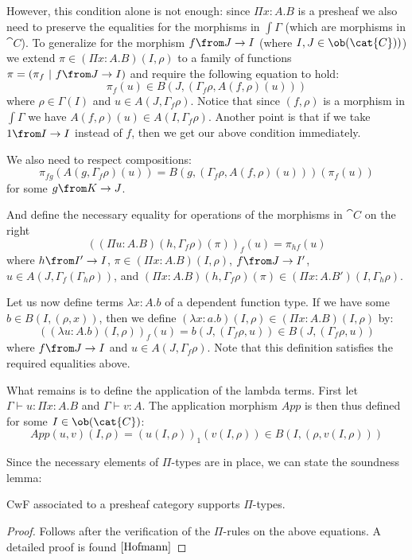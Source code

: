 However, this condition alone is not enough: since $\Pi x: A.B$ is a presheaf
we also need to preserve the equalities for the morphisms in $\int \Gamma$
(which are morphisms in $\cat{C}$). To generalize for the morphism $f \from J
\to I$ (where $I, J \in \ob(\cat{C}))$) we extend $\pi \in (\Pi x: A.B)(I,
\rho)$ to a family of functions $\pi = (\pi_f~|~f \from J \to I)$ and require
the following equation to hold:
\[
  \pi_f(u) \in B(J, (\Gamma_f \rho, A(f, \rho)(u)))
\]
where $\rho \in \Gamma(I)$ and $u \in A(J, \Gamma_f \rho)$. Notice that since
$(f, \rho)$ is a morphism in $\int \Gamma$ we have $A(f, \rho)(u) \in A(I,
\Gamma_f \rho)$. Another point is that if we take $1 \from I \to I$ instead of
$f$, then we get our above condition immediately.

We also need to respect compositions:
\[
  \pi_{fg}(A(g, \Gamma_f \rho)(u)) = B(g, (\Gamma_f \rho, A(f, \rho)(u)))(\pi_f(u))
\]
for some $g \from K \to J$.

And define the necessary equality for operations of the morphisms in $\cat{C}$
on the right
\[
  ((\Pi u: A.B)(h, \Gamma_f \rho)(\pi))_f(u) = \pi_{hf}(u)
\]
where $h \from I' \to I$, $\pi \in (\Pi x:A.B)(I, \rho)$, $f \from J \to I'$,
$u \in A(J, \Gamma_f(\Gamma_h \rho))$, and $(\Pi x: A.B)(h, \Gamma_f \rho)(\pi)
\in (\Pi x: A.B')(I, \Gamma_h \rho)$.

Let us now define terms $\lambda x: A. b$ of a dependent function type. If we
have some $b \in B(I, (\rho, x))$, then we define $(\lambda x: a.b)(I, \rho)
\in (\Pi x: A.B)(I, \rho)$ by:
\[
  ((\lambda u: A.b)(I, \rho))_f(u) = b(J, (\Gamma_f \rho, u)) \in B(J, (\Gamma_f \rho, u))
\]
where $f \from J \to I$ and $u \in A(J, \Gamma_f \rho)$. Note that this
definition satisfies the required equalities above.

What remains is to define the application of the lambda terms. First let
$\Gamma \vdash u : \Pi x:A.B$ and $\Gamma \vdash v : A$. The application
morphism $App$ is then thus defined for some $I \in \ob(\cat{C})$:
\[
  App(u, v)(I, \rho) = (u(I, \rho))_1(v(I, \rho)) \in B(I, (\rho, v(I, \rho)))
\]

Since the necessary elements of $\Pi$-types are in place, we can state the soundness lemma:
\begin{lemma}
  CwF associated to a presheaf category supports $\Pi$-types.
  \begin{proof}
    Follows after the verification of the $\Pi$-rules on the above equations. A
    detailed proof is found $\cite{Hofmann}$
  \end{proof}
\end{lemma}

